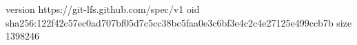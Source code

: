 version https://git-lfs.github.com/spec/v1
oid sha256:122f42c57ec0ad707bf05d7c5cc38bc5faa0e3c6bf3e4c2c4e27125e499ccb7b
size 1398246
